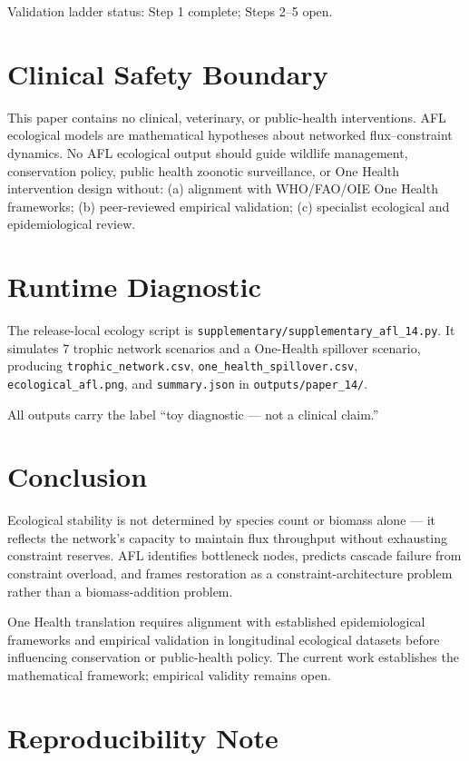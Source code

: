 \documentclass[11pt]{article}
\begin{document}
Validation ladder status: Step 1 complete; Steps 2--5 open.

\section{Clinical Safety Boundary}

This paper contains no clinical, veterinary, or public-health interventions. AFL ecological models are mathematical hypotheses about networked flux--constraint dynamics. No AFL ecological output should guide wildlife management, conservation policy, public health zoonotic surveillance, or One Health intervention design without: (a) alignment with WHO/FAO/OIE One Health frameworks; (b) peer-reviewed empirical validation; (c) specialist ecological and epidemiological review.

\section{Runtime Diagnostic}

The release-local ecology script is \texttt{supplementary/supplementary\_afl\_14.py}. It simulates 7 trophic network scenarios and a One-Health spillover scenario, producing \texttt{trophic\_network.csv}, \texttt{one\_health\_spillover.csv}, \texttt{ecological\_afl.png}, and \texttt{summary.json} in \texttt{outputs/paper\_14/}.

All outputs carry the label ``toy diagnostic --- not a clinical claim.''

\section{Conclusion}

Ecological stability is not determined by species count or biomass alone --- it reflects the network's capacity to maintain flux throughput without exhausting constraint reserves. AFL identifies bottleneck nodes, predicts cascade failure from constraint overload, and frames restoration as a constraint-architecture problem rather than a biomass-addition problem.

One Health translation requires alignment with established epidemiological frameworks and empirical validation in longitudinal ecological datasets before influencing conservation or public-health policy. The current work establishes the mathematical framework; empirical validity remains open.

\section{Reproducibility Note}
\end{document}

